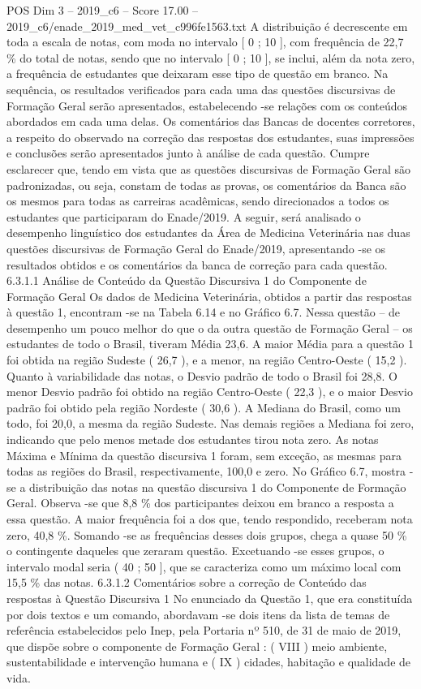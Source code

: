 \begin{textsample}{POS Dim 3 – 2019\_c6 – Score 17.00 – 2019\_c6/enade\_2019\_med\_vet\_c996fe1563.txt}
A distribuição é decrescente em toda a escala de notas, com moda no intervalo [ 0 ; 10 ], com frequência de 22,7 \% do total de notas, sendo que no intervalo [ 0 ; 10 ], se inclui, além da nota zero, a frequência de estudantes que deixaram esse tipo de questão em branco.
Na sequência, os resultados verificados para cada uma das questões discursivas de Formação Geral serão apresentados, estabelecendo -se relações com os conteúdos abordados em cada uma delas.
Os comentários das Bancas de docentes corretores, a respeito do observado na correção das respostas dos estudantes, suas impressões e conclusões serão apresentados junto à análise de cada questão.
Cumpre esclarecer que, tendo em vista que as questões discursivas de Formação Geral são padronizadas, ou seja, constam de todas as provas, os comentários da Banca são os mesmos para todas as carreiras acadêmicas, sendo direcionados a todos os estudantes que participaram do Enade/2019.
A seguir, será analisado o desempenho linguístico dos estudantes da Área de Medicina Veterinária nas duas questões discursivas de Formação Geral do Enade/2019, apresentando -se os resultados obtidos e os comentários da banca de correção para cada questão. 6.3.1.1 Análise de Conteúdo da Questão Discursiva 1 do Componente de Formação Geral Os dados de Medicina Veterinária, obtidos a partir das respostas à questão 1, encontram -se na Tabela 6.14 e no Gráfico 6.7.
Nessa questão – de desempenho um pouco melhor do que o da outra questão de Formação Geral – os estudantes de todo o Brasil, tiveram Média 23,6.
A maior Média para a questão 1 foi obtida na região Sudeste ( 26,7 ), e a menor, na região Centro-Oeste ( 15,2 ).
Quanto à variabilidade das notas, o Desvio padrão de todo o Brasil foi 28,8.
O menor Desvio padrão foi obtido na região Centro-Oeste ( 22,3 ), e o maior Desvio padrão foi obtido pela região Nordeste ( 30,6 ).
A Mediana do Brasil, como um todo, foi 20,0, a mesma da região Sudeste.
Nas demais regiões a Mediana foi zero, indicando que pelo menos metade dos estudantes tirou nota zero.
As notas Máxima e Mínima da questão discursiva 1 foram, sem exceção, as mesmas para todas as regiões do Brasil, respectivamente, 100,0 e zero.
No Gráfico 6.7, mostra -se a distribuição das notas na questão discursiva 1 do Componente de Formação Geral.
Observa -se que 8,8 \% dos participantes deixou em branco a resposta a essa questão.
A maior frequência foi a dos que, tendo respondido, receberam nota zero, 40,8 \%.
Somando -se as frequências desses dois grupos, chega a quase 50 \% o contingente daqueles que zeraram questão.
Excetuando -se esses grupos, o intervalo modal seria ( 40 ; 50 ], que se caracteriza como um máximo local com 15,5 \% das notas. 6.3.1.2 Comentários sobre a correção de Conteúdo das respostas à Questão Discursiva 1 No enunciado da Questão 1, que era constituída por dois textos e um comando, abordavam -se dois itens da lista de temas de referência estabelecidos pelo Inep, pela Portaria nº 510, de 31 de maio de 2019, que dispõe sobre o componente de Formação Geral : ( VIII ) meio ambiente, sustentabilidade e intervenção humana e ( IX ) cidades, habitação e qualidade de vida.

\end{textsample}

